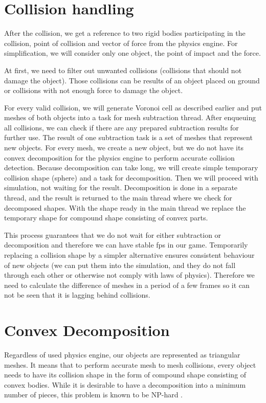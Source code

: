 \section{Collision handling}
\label{sec:collisions}
After the collision, we get a reference to two rigid bodies participating in the collision, point of collision and vector of force from the physics engine. For simplification, we will consider only one object, the point of impact and the force.

At first, we need to filter out unwanted collisions (collisions that should not damage the object). Those collisions can be results of an object placed on ground or collisions with not enough force to damage the object. 

For every valid collision, we will generate Voronoi cell as described earlier and put meshes of both objects into a task for mesh subtraction thread. After enqueuing all collisions, we can check if there are any prepared subtraction results for further use. The result of one subtraction task is a set of meshes that represent new objects. For every mesh, we create a new object, but we do not have its convex decomposition for the physics engine to perform accurate collision detection. Because decomposition can take long, we will create simple temporary collision shape (\eg sphere) and a task for decomposition. Then we will proceed with simulation, not waiting for the result. Decomposition is done in a separate thread, and the result is returned to the main thread where we check for decomposed shapes. With the shape ready in the main thread we replace the temporary shape for compound shape consisting of convex parts.

This process guarantees that we do not wait for either subtraction or decomposition and therefore we can have stable fps in our game. Temporarily replacing a collision shape by a simpler alternative ensures consistent behaviour of new objects (we can put them into the simulation, and they do not fall through each other or otherwise not comply with laws of physics). Therefore we need to calculate the difference of meshes in a period of a few frames so it can not be seen that it is lagging behind collisions.

\section{Convex Decomposition}
\label{sec:decomposition}
Regardless of used physics engine, our objects are represented as triangular meshes. It means that to perform accurate mesh to mesh collisions, every object needs to have its collision shape in the form of compound shape consisting of convex bodies. While it is desirable to have a decomposition into a minimum number of pieces, this problem is known to be NP-hard \cite{convexDecomp}. 

